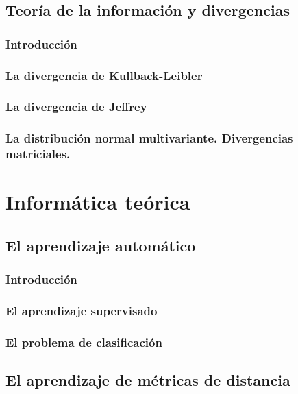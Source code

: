 \documentclass{book}
\begin{document}
\chapter{Teoría de la información y divergencias}


\section{Introducción}

\section{La divergencia de Kullback-Leibler}

\section{La divergencia de Jeffrey}

\section{La distribución normal multivariante. Divergencias matriciales.}



\part{Informática teórica}

\chapter{El aprendizaje automático}

\section{Introducción}

\section{El aprendizaje supervisado}

\section{El problema de clasificación}


\chapter{El aprendizaje de métricas de distancia}
\end{document}
